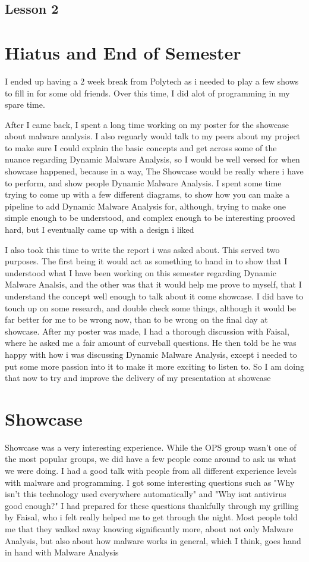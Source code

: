 \documentclass{article}
\begin{document}
\subsection{Lesson 2}


\section{Hiatus and End of Semester}
I ended up having a 2 week break from Polytech as i needed to play a few shows to fill in for some old friends. Over this time, I did alot of programming in my spare time. 

After I came back, I spent a long time working on my poster for the showcase about malware analysis. I also reguarly would talk to my peers about my project to make sure I could explain the basic concepts and get across some of the nuance regarding Dynamic Malware Analysis, so I would be well versed for when showcase happened, because in a way, The Showcase would be really where i have to perform, and show people Dynamic Malware Analysis. I spent some time trying to come up with a few different diagrams, to show how you can make a pipeline to add Dynamic Malware Analysis for, although, trying to make one simple enough to be understood, and complex enough to be interesting prooved hard, but I eventually came up with a design i liked

I also took this time to write the report i was asked about. This served two purposes. The first being it would act as something to hand in to show that I understood what I have been working on this semester regarding Dynamic Malware Analsis, and the other was that it would help me prove to myself, that I understand the concept well enough to talk about it come showcase. I did have to touch up on some research, and double check some things, although it would be far better for me to be wrong now, than to be wrong on the final day at showcase.  After my poster was made, I had a thorough discussion with Faisal, where he asked me a fair amount of curveball questions. He then told be he was happy with how i was discussing Dynamic Malware Analysis, except i needed to put some more passion into it to make it more exciting to listen to. So I am doing that now to try and improve the delivery of my presentation at showcase


\section{Showcase}

Showcase was a very interesting experience. While the OPS group wasn't one of the most popular groups, we did have a few people come around to ask us what we were doing. I had a good talk with people from all different experience levels with malware and programming. I got some interesting questions such as "Why isn't this technology used everywhere automatically" and "Why isnt antivirus good enough?" I had prepared for these questions thankfully through my grilling by Faisal, who i felt really helped me to get through the night. Most people told me that they walked away knowing significantly more, about not only Malware Analysis, but also about how malware works in general, which I think, goes hand in hand with Malware Analysis
\end{document}
